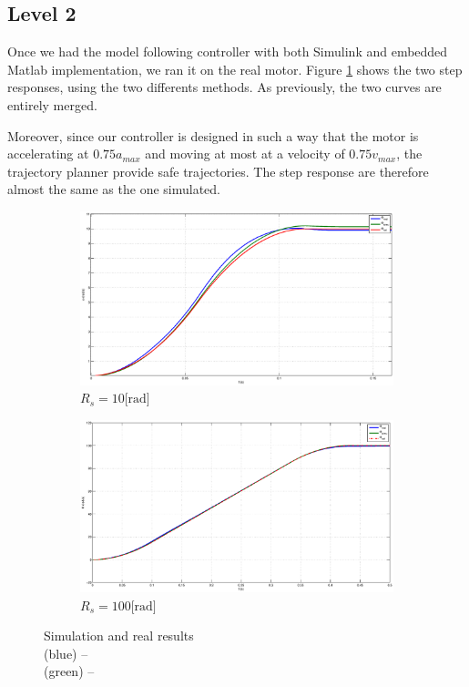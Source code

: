 \subsection*{Level 2}

Once we had the model following controller with both Simulink and embedded Matlab implementation, we ran it on the real motor. Figure \ref{realresults} shows the two step responses, using the two differents methods. As previously, the two curves are entirely merged.

Moreover, since our controller is designed in such a way that the motor is accelerating at $0.75 a_{max}$ and moving at most at a velocity of $0.75 v_{max}$, the trajectory planner provide safe trajectories. The step response are therefore almost the same as the one simulated.

\begin{figure}[hb]
  \centering
 \begin{subfigure}[b]{\linewidth}
 \includegraphics[width=\columnwidth]{fig/10rad.eps}
 \caption{$R_s = 10\text{[rad]}$}
 \end{subfigure}
 \begin{subfigure}[b]{\linewidth}
 \includegraphics[width=\columnwidth]{fig/100rad.eps}
 \caption{$R_s = 100\text{[rad]}$}
 \end{subfigure}
 \caption{Simulation and real results \\ (blue) -- \\ (green) --}
 \label{realresults}
\end{figure}
